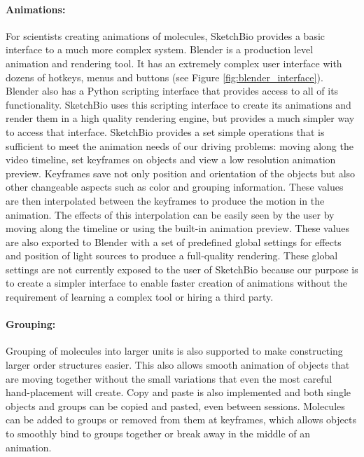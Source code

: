 \documentclass[twocolumn]{bmcart}%
\begin{document}
\paragraph*{Animations:}
For scientists creating animations of molecules, SketchBio provides a basic interface to a much more complex system.
Blender is a production level animation and rendering tool.  It has an extremely complex user interface with dozens of hotkeys, menus and buttons (see Figure \ref{fig:blender_interface}).
Blender also has a Python scripting interface that provides access to all of its functionality.
SketchBio uses this scripting interface to create its animations and render them in a high quality rendering engine, but provides a much simpler way to access that interface.
SketchBio provides a set simple operations that is sufficient to meet the animation needs of our driving problems: moving along the video timeline, set keyframes on objects and view a low resolution animation preview.
Keyframes save not only position and orientation of the objects but also other changeable aspects such as color and grouping information.
These values are then interpolated between the keyframes to produce the motion in the animation.
The effects of this interpolation can be easily seen by the user by moving along the timeline or using the built-in animation preview.
These values are also exported to Blender with a set of predefined global settings for effects and position of light sources to produce a full-quality rendering.
These global settings are not currently exposed to the user of SketchBio because our purpose is to create a simpler interface to enable faster creation of animations without the requirement of learning a complex tool or hiring a third party.

\paragraph*{Grouping:}
Grouping of molecules into larger units is also supported to make constructing larger order structures easier.
This also allows smooth animation of objects that are moving together without the small variations that even the most careful hand-placement will create.
Copy and paste is also implemented and both single objects and groups can be copied and pasted, even between sessions.
Molecules can be added to groups or removed from them at keyframes, which allows objects to smoothly bind to groups together or break away in the middle of an animation.
\end{document}
